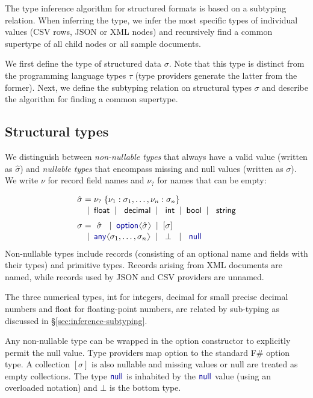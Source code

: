 \documentclass[10pt,preprint,blind,clearpagebib]{sigplanconf}
\newcommand{\langl}{\begin{picture}(4.5,7)
\put(1.1,2.5){\rotatebox{60}{\line(1,0){5.5}}}
\put(1.1,2.5){\rotatebox{300}{\line(1,0){5.5}}}
\end{picture}}
\newcommand{\rangl}{\begin{picture}(4.5,7)
\put(.9,2.5){\rotatebox{120}{\line(1,0){5.5}}}
\put(.9,2.5){\rotatebox{240}{\line(1,0){5.5}}}
\end{picture}}
\newcommand{\kvd}[1]{\textnormal{\textcolor{kvdclr}{\sffamily #1}}}
\newcommand{\ident}[1]{\textnormal{\sffamily #1}}
\newcommand{\lsep}[0]{\;\; | \;\;}
\newcommand{\narrow}[1]{\hspace{-0.7em} #1 \hspace{-0.7em}}
\begin{document}
The type inference algorithm for structured formats is based on a subtyping relation. When 
inferring the type, we infer the most specific types of individual values (CSV rows, JSON or XML 
nodes) and recursively find a common supertype of all child nodes or all sample documents.

We first define the type of structured data $\sigma$. Note that this type is distinct 
from the programming language types $\tau$ (type providers generate the latter from the former). 
Next, we define the subtyping relation on structural types $\sigma$ and describe the algorithm 
for finding a common supertype. 

\subsection{Structural types}
\label{sec:inference-types}

We distinguish between \emph{non-nullable types} that always have a valid value (written as 
$\hat{\sigma}$) and \emph{nullable types} that encompass missing and \kvd{null} values 
(written as $\sigma$). We write $\nu$ for record field names and $\nu_?$ for names that can be empty:

\noindent
\begin{equation*}
\begin{array}{rcl}
 \hat{\sigma} &\narrow{=}& \nu_?\; \{ \nu_1 : \sigma_1, \ldots, \nu_n : \sigma_n \} \\[0.1em]
                &\narrow{|}& \ident{float} \lsep \ident{decimal} \lsep \ident{int} \lsep \ident{bool} \lsep \ident{string} 
 \\[0.6em] 
       \sigma &\narrow{=}& ~\hat{\sigma}~ \lsep \kvd{option}\langl \hat{\sigma} \rangl \lsep [\sigma] \\[0.1em]
              &\narrow{|}& \kvd{any}\langl\sigma_1, \ldots, \sigma_n\rangl \lsep ~\bot~ \lsep \kvd{null}
\end{array}
\end{equation*}
%
Non-nullable types include records (consisting of an optional name and fields with their types) 
and primitive types. Records arising from XML documents are named, while records used by 
JSON and CSV providers are unnamed. 

The three numerical types, \ident{int} for integers, \ident{decimal} for small precise decimal 
numbers and \ident{float} for floating-point numbers, are related by sub-typing as discussed in 
\S\ref{sec:inference-subtyping}.

Any non-nullable type can be wrapped in the \kvd{option} constructor to explicitly permit the 
\kvd{null} value. Type providers map \kvd{option} to the standard F\# option type. A collection $[\sigma]$ 
is also nullable and missing values or \kvd{null} are treated as empty collections. The type 
$\kvd{null}$ is inhabited by the $\kvd{null}$ value (using an overloaded notation) and $\bot$ 
is the bottom type.
\end{document}

